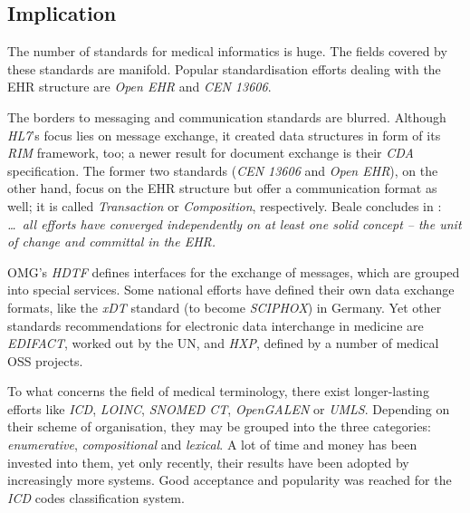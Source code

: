 %
%
%
%
%
%
%

\subsection{Implication}
\label{implication_heading}

The number of standards for medical informatics is huge. The fields covered by
these standards are manifold. Popular standardisation efforts dealing with the
EHR structure are \emph{Open EHR} and \emph{CEN 13606}.

The borders to messaging and communication standards are blurred. Although
\emph{HL7}'s focus lies on message exchange, it created data structures in form
of its \emph{RIM} framework, too; a newer result for document exchange is their
\emph{CDA} specification. The former two standards (\emph{CEN 13606} and
\emph{Open EHR}), on the other hand, focus on the EHR structure but offer a
communication format as well; it is called \emph{Transaction} or
\emph{Composition}, respectively. Beale concludes in \cite{openhealth}:
\textit{\ldots\ all efforts have converged independently on at least one solid
concept -- the unit of change and committal in the EHR.}

OMG's \emph{HDTF} defines interfaces for the exchange of messages, which are
grouped into special services. Some national efforts have defined their own
data exchange formats, like the \emph{xDT} standard (to become \emph{SCIPHOX})
in Germany. Yet other standards recommendations for electronic data interchange
in medicine are \emph{EDIFACT}, worked out by the UN, and \emph{HXP}, defined
by a number of medical OSS projects.

To what concerns the field of medical terminology, there exist longer-lasting
efforts like \emph{ICD}, \emph{LOINC}, \emph{SNOMED CT}, \emph{OpenGALEN} or
\emph{UMLS}. Depending on their scheme of organisation, they may be grouped
into the three categories: \emph{enumerative}, \emph{compositional} and
\emph{lexical}. A lot of time and money has been invested into them, yet only
recently, their results have been adopted by increasingly more systems. Good
acceptance and popularity was reached for the \emph{ICD} codes classification
system.

